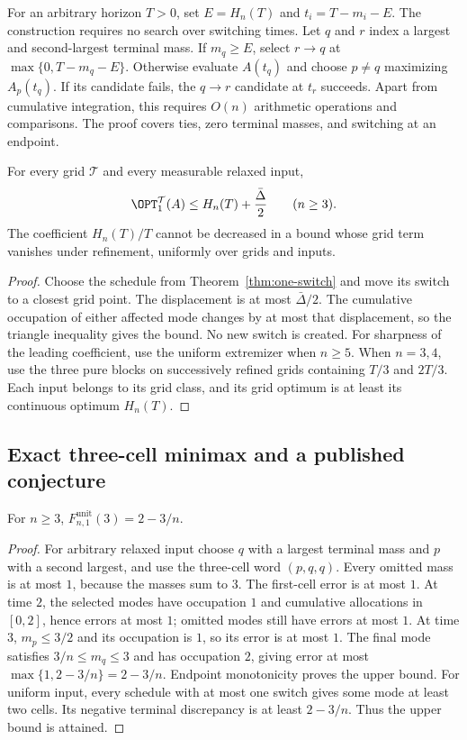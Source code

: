 For an arbitrary horizon $T>0$, set $E=H_n(T)$ and $t_i=T-m_i-E$.
The construction requires no search over switching times. Let $q$ and $r$
index a largest and second-largest terminal mass. If $m_q\ge E$, select
$r\to q$ at $\max\{0,T-m_q-E\}$. Otherwise evaluate $A(t_q)$ and
choose $p\ne q$ maximizing $A_p(t_q)$. If its candidate fails, the
$q\to r$ candidate at $t_r$ succeeds. Apart from cumulative integration,
this requires $O(n)$ arithmetic operations and comparisons. The proof covers
ties, zero terminal masses, and switching at an endpoint.

\begin{corollary}\label{cor:one-switch-grid}
For every grid $\mathcal T$ and every measurable relaxed input,
\[
 \OPT_1^{\mathcal T}(A)\le H_n(T)+\frac{\bar\Delta}{2}\qquad(n\ge3).
\]
The coefficient $H_n(T)/T$ cannot be decreased in a bound whose grid term
vanishes under refinement, uniformly over grids and inputs.
\end{corollary}
\begin{proof}
Choose the schedule from Theorem~\ref{thm:one-switch} and move its switch to
a closest grid point. The displacement is at most $\bar\Delta/2$. The
cumulative occupation of either affected mode changes by at most that
displacement, so the triangle inequality gives the bound. No new switch is
created. For sharpness of the leading coefficient, use the uniform extremizer
when $n\ge5$. When $n=3,4$, use the three pure blocks on successively refined
grids containing $T/3$ and $2T/3$. Each input belongs to its grid class, and
its grid optimum is at least its continuous optimum $H_n(T)$.
\end{proof}

\subsection{Exact three-cell minimax and a published conjecture}

\begin{proposition}\label{prop:three-cells}
For $n\ge3$, $F^{\mathrm{unit}}_{n,1}(3)=2-3/n$.
\end{proposition}
\begin{proof}
For arbitrary relaxed input choose $q$ with a largest terminal mass and $p$
with a second largest, and use the three-cell word $(p,q,q)$. Every omitted
mass is at most $1$, because the masses sum to $3$. The first-cell error is
at most $1$. At time $2$, the selected modes have occupation $1$ and
cumulative allocations in $[0,2]$, hence errors at most $1$; omitted modes
still have errors at most $1$. At time $3$, $m_p\le3/2$ and its occupation
is $1$, so its error is at most $1$. The final mode satisfies
$3/n\le m_q\le3$ and has occupation $2$, giving error at most
$\max\{1,2-3/n\}=2-3/n$. Endpoint monotonicity proves the upper bound.
For uniform input, every schedule with at most one switch gives some mode
at least two cells. Its negative terminal discrepancy is at least
$2-3/n$. Thus the upper bound is attained.
\end{proof}

